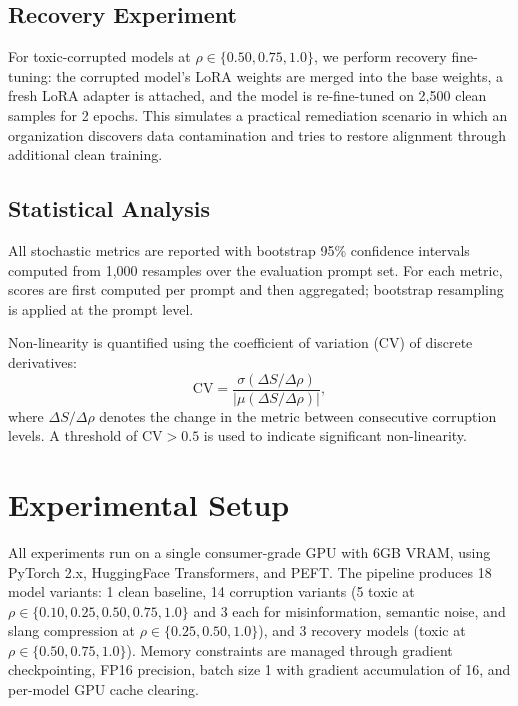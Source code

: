 \documentclass[conference]{IEEEtran}
\begin{document}
\subsection{Recovery Experiment}
\label{sec:recovery_method}

For toxic-corrupted models at $\rho \in \{0.50, 0.75, 1.0\}$, we perform recovery fine-tuning: the corrupted model's LoRA weights are merged into the base weights, a fresh LoRA adapter is attached, and the model is re-fine-tuned on 2,500 clean samples for 2 epochs. This simulates a practical remediation scenario in which an organization discovers data contamination and tries to restore alignment through additional clean training.

\subsection{Statistical Analysis}

All stochastic metrics are reported with bootstrap 95\% confidence intervals computed from 1{,}000 resamples over the evaluation prompt set. For each metric, scores are first computed per prompt and then aggregated; bootstrap resampling is applied at the prompt level.

Non-linearity is quantified using the coefficient of variation (CV) of discrete derivatives:
\[
\text{CV} = \frac{\sigma(\Delta S / \Delta \rho)}{|\mu(\Delta S / \Delta \rho)|},
\]
where $\Delta S / \Delta \rho$ denotes the change in the metric between consecutive corruption levels. A threshold of $\text{CV} > 0.5$ is used to indicate significant non-linearity.

\section{Experimental Setup}
\label{sec:setup}

All experiments run on a single consumer-grade GPU with 6GB VRAM, using PyTorch 2.x, HuggingFace Transformers, and PEFT. The pipeline produces 18 model variants: 1 clean baseline, 14 corruption variants (5 toxic at $\rho \in \{0.10, 0.25, 0.50, 0.75, 1.0\}$ and 3 each for misinformation, semantic noise, and slang compression at $\rho \in \{0.25, 0.50, 1.0\}$), and 3 recovery models (toxic at $\rho \in \{0.50, 0.75, 1.0\}$). Memory constraints are managed through gradient checkpointing, FP16 precision, batch size 1 with gradient accumulation of 16, and per-model GPU cache clearing.
\end{document}
